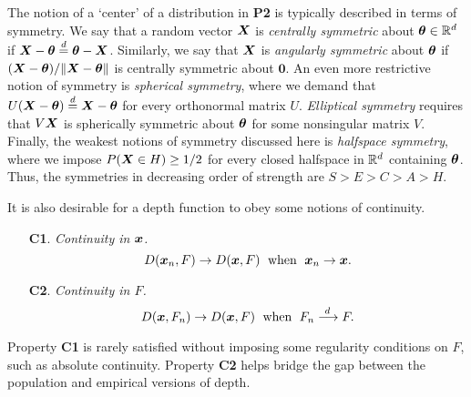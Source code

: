 The notion of a `center' of a distribution in \textbf{P2} is typically
described in terms of symmetry.
We say that a random vector $\bm{X}$ is \emph{centrally symmetric} about
$\bm{\theta} \in \mathbb{R}^d$ if $\bm{X} - \bm{\theta} \overset{d}{=} \bm{\theta} - \bm{X}$.
Similarly, we say that $\bm{X}$ is \emph{angularly symmetric} about $\bm{\theta}$ if
$(\bm{X} - \bm{\theta}) / \Vert \bm{X} - \bm{\theta} \Vert$ is centrally symmetric about $\bm0$.
An even more restrictive notion of symmetry is \emph{spherical symmetry},
where we demand that $U(\bm{X} - \bm{\theta}) \overset{d}{=} \bm{X} - \bm{\theta}$ for every orthonormal
matrix $U$.
\emph{Elliptical symmetry} requires that $V\bm{X}$ is spherically symmetric about
$\bm{\theta}$ for some nonsingular matrix $V$.
Finally, the weakest notions of symmetry discussed here is \emph{halfspace
symmetry}, where we impose $P(\bm{X} \in H) \geq 1/2$ for every closed halfspace
in $\mathbb{R}^d$ containing $\bm{\theta}$.
Thus, the symmetries in decreasing order of strength are $S > E > C > A > H$.


It is also desirable for a depth function to obey some notions of continuity.
\begin{enumerate}
    \item[\textbf{C1}.] \emph{Continuity in $\bm{x}$.}
    \begin{equation}
        D(\bm{x}_n, F) \to D(\bm{x}, F)\;\text{ when }\; \bm{x}_n \to \bm{x}.
    \end{equation}

    \item[\textbf{C2}.] \emph{Continuity in $F$.}
    \begin{equation}
        D(\bm{x}, F_n) \to D(\bm{x}, F)\;\text{ when }\; F_n \overset{d\,}{\longrightarrow} F.
    \end{equation}
\end{enumerate}

Property \textbf{C1} is rarely satisfied without imposing some regularity
conditions on $F$, such as absolute continuity.
Property \textbf{C2} helps bridge the gap between the population and empirical
versions of depth.














